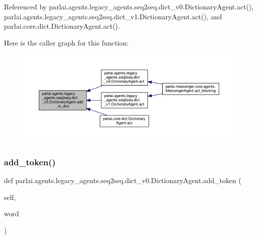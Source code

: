 Referenced by parlai.\+agents.\+legacy\+\_\+agents.\+seq2seq.\+dict\+\_\+v0.\+Dictionary\+Agent.\+act(), parlai.\+agents.\+legacy\+\_\+agents.\+seq2seq.\+dict\+\_\+v1.\+Dictionary\+Agent.\+act(), and parlai.\+core.\+dict.\+Dictionary\+Agent.\+act().

Here is the caller graph for this function\+:
\nopagebreak
\begin{figure}[H]
\begin{center}
\leavevmode
\includegraphics[width=350pt]{classparlai_1_1agents_1_1legacy__agents_1_1seq2seq_1_1dict__v0_1_1DictionaryAgent_aeae5dabd12a2ab943f75d01a1dbb091c_icgraph}
\end{center}
\end{figure}
\mbox{\label{classparlai_1_1agents_1_1legacy__agents_1_1seq2seq_1_1dict__v0_1_1DictionaryAgent_abd9065c5c2862e81e3a1edb221ec7491}} 
\subsubsection{\texorpdfstring{add\+\_\+token()}{add\_token()}}
{\footnotesize\ttfamily def parlai.\+agents.\+legacy\+\_\+agents.\+seq2seq.\+dict\+\_\+v0.\+Dictionary\+Agent.\+add\+\_\+token (\begin{DoxyParamCaption}\item[{}]{self,  }\item[{}]{word }\end{DoxyParamCaption})}



